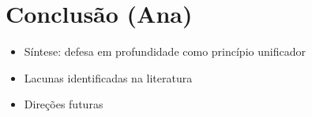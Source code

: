 {
\color{olive}

\section{
    Conclusão (Ana)
} \label{sec:conclusao}

\begin{itemize}
    \item Síntese: defesa em profundidade como princípio unificador
    \item Lacunas identificadas na literatura
    \item Direções futuras
\end{itemize}

\lipsum[1-2]
}